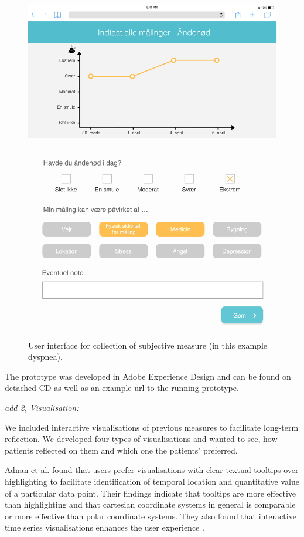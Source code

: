 \begin{figure}[h]
\begin{minipage}[b]{0.45\textwidth}
    \includegraphics[width=\textwidth]{images/study2/collectionSub.png}
    \caption{User interface for collection of subjective measure (in this example dyspnea).}
    \label{fig:colSubj}
  \end{minipage}
\end{figure}

The prototype was developed in Adobe Experience Design and can be found on detached CD as well as an example url to the running prototype.

\textit{add 2, Visualisation:}

We included interactive visualisations of previous measures to facilitate long-term reflection. We developed four types of visualisations and wanted to see, how patients reflected on them and which one the patients' preferred. 

Adnan et al. found that users prefer visualisations with clear textual tooltips over highlighting to facilitate identification of temporal location and quantitative value of a particular data point. Their findings indicate that tooltips are more effective than highlighting and that cartesian coordinate systems in general is comparable or more effective than polar coordinate systems. They also found that interactive time series visualisations enhances the user experience \citep{adnan2016}.

